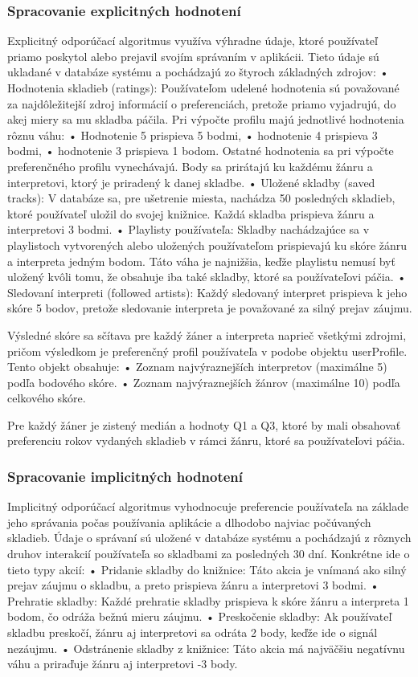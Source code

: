 \subsubsection{Spracovanie explicitných hodnotení}
Explicitný odporúčací algoritmus využíva výhradne údaje, ktoré používateľ priamo poskytol alebo prejavil svojím správaním v aplikácii. Tieto údaje sú ukladané v databáze systému a pochádzajú zo štyroch základných zdrojov:
	•	Hodnotenia skladieb (ratings):
Používateľom udelené hodnotenia sú považované za najdôležitejší zdroj informácií o preferenciách, pretože priamo vyjadrujú, do akej miery sa mu skladba páčila. Pri výpočte profilu majú jednotlivé hodnotenia rôznu váhu:
	•	Hodnotenie 5 prispieva 5 bodmi,
	•	hodnotenie 4 prispieva 3 bodmi,
	•	hodnotenie 3 prispieva 1 bodom.
Ostatné hodnotenia sa pri výpočte preferenčného profilu vynechávajú. Body sa prirátajú ku každému žánru a interpretovi, ktorý je priradený k danej skladbe.
	•	Uložené skladby (saved tracks):
V databáze sa, pre ušetrenie miesta, nachádza 50 posledných skladieb, ktoré používateľ uložil do svojej knižnice. Každá skladba prispieva žánru a interpretovi 3 bodmi.
	•	Playlisty používateľa:
Skladby nachádzajúce sa v playlistoch vytvorených alebo uložených používateľom prispievajú ku skóre žánru a interpreta jedným bodom. Táto váha je najnižšia, keďže playlistu nemusí byť uložený kvôli tomu, že obsahuje iba také skladby, ktoré sa používateľovi páčia.
	•	Sledovaní interpreti (followed artists):
Každý sledovaný interpret prispieva k jeho skóre 5 bodov, pretože sledovanie interpreta je považované za silný prejav záujmu.

Výsledné skóre sa sčítava pre každý žáner a interpreta naprieč všetkými zdrojmi, pričom výsledkom je preferenčný profil používateľa v podobe objektu userProfile. Tento objekt obsahuje:
	•	Zoznam najvýraznejších interpretov (maximálne 5) podľa bodového skóre.
        •	Zoznam najvýraznejších žánrov (maximálne 10) podľa celkového skóre.
        
Pre každý žáner je zistený medián a hodnoty Q1 a Q3, ktoré by mali obsahovať preferenciu rokov vydaných skladieb v rámci žánru, ktoré sa používateľovi páčia.

\subsubsection{Spracovanie implicitných hodnotení}

Implicitný odporúčací algoritmus vyhodnocuje preferencie používateľa na základe jeho správania počas používania aplikácie a dlhodobo najviac počúvaných skladieb. Údaje o správaní sú uložené v databáze systému a pochádzajú z rôznych druhov interakcií používateľa so skladbami za posledných 30 dní. Konkrétne ide o tieto typy akcií:
	•	Pridanie skladby do knižnice: Táto akcia je vnímaná ako silný prejav záujmu o skladbu, a preto prispieva žánru a interpretovi 3 bodmi.
	•	Prehratie skladby: Každé prehratie skladby prispieva k skóre žánru a interpreta 1 bodom, čo odráža bežnú mieru záujmu.
	•	Preskočenie skladby: Ak používateľ skladbu preskočí, žánru aj interpretovi sa odráta 2 body, keďže ide o signál nezáujmu.
	•	Odstránenie skladby z knižnice: Táto akcia má najväčšiu negatívnu váhu a priraďuje žánru aj interpretovi -3 body.

